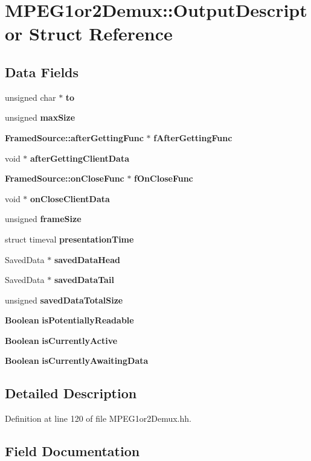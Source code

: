 \section{M\+P\+E\+G1or2\+Demux\+:\+:Output\+Descriptor Struct Reference}
\label{structMPEG1or2Demux_1_1OutputDescriptor}
\subsection*{Data Fields}
\begin{DoxyCompactItemize}
\item 
unsigned char $\ast$ {\bf to}
\item 
unsigned {\bf max\+Size}
\item 
{\bf Framed\+Source\+::after\+Getting\+Func} $\ast$ {\bf f\+After\+Getting\+Func}
\item 
void $\ast$ {\bf after\+Getting\+Client\+Data}
\item 
{\bf Framed\+Source\+::on\+Close\+Func} $\ast$ {\bf f\+On\+Close\+Func}
\item 
void $\ast$ {\bf on\+Close\+Client\+Data}
\item 
unsigned {\bf frame\+Size}
\item 
struct timeval {\bf presentation\+Time}
\item 
Saved\+Data $\ast$ {\bf saved\+Data\+Head}
\item 
Saved\+Data $\ast$ {\bf saved\+Data\+Tail}
\item 
unsigned {\bf saved\+Data\+Total\+Size}
\item 
{\bf Boolean} {\bf is\+Potentially\+Readable}
\item 
{\bf Boolean} {\bf is\+Currently\+Active}
\item 
{\bf Boolean} {\bf is\+Currently\+Awaiting\+Data}
\end{DoxyCompactItemize}


\subsection{Detailed Description}


Definition at line 120 of file M\+P\+E\+G1or2\+Demux.\+hh.



\subsection{Field Documentation}
